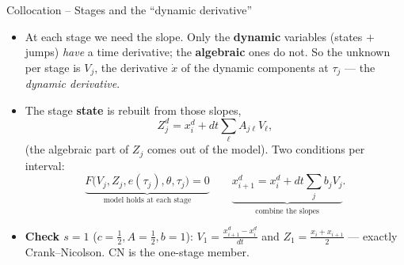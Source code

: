 \documentclass[11pt,aspectratio=169]{beamer}
\begin{document}
\begin{frame}{Collocation -- Stages and the ``dynamic derivative''}

\begin{itemize}

\item At each stage we need the slope. Only the \textbf{dynamic} variables
  (states $+$ jumps) \emph{have} a time derivative; the \textbf{algebraic}
  ones do not. So the unknown per stage is $V_j$, the derivative
  $\dot x$ of the dynamic components at $\tau_j$ — the \emph{dynamic
  derivative}.\newline

\item The stage \textbf{state} is rebuilt from those slopes,
  \[
  Z_j^d = x_i^d + dt\textstyle\sum_\ell A_{j\ell} V_\ell,
  \]
  (the algebraic part of $Z_j$ comes out of the model). Two conditions per
  interval:
  \[
  \underbrace{F\!\bigl(V_j, Z_j, e(\tau_j), \theta, \tau_j\bigr)=0}_{\text{model holds at each stage}}
  \qquad
  \underbrace{x_{i+1}^d = x_i^d + dt\textstyle\sum_j b_j V_j}_{\text{combine the slopes}} .
  \]

\item \textbf{Check $s=1$} ($c=\tfrac12, A=\tfrac12, b=1$):
  $V_1=\tfrac{x_{i+1}^d-x_i^d}{dt}$ and $Z_1=\tfrac{x_i+x_{i+1}}{2}$ —
  exactly Crank--Nicolson. CN is the one-stage member.

\end{itemize}

\end{frame}
\end{document}
